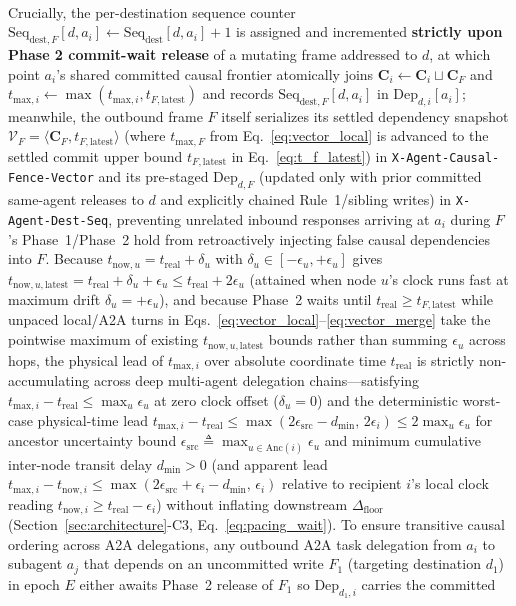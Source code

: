 \documentclass[conference,10pt]{IEEEtran}
\begin{document}
\begin{enumerate}
\begin{equation}
\begin{aligned}
    \end{aligned}
    \label{eq:vector_local}
    \end{equation}
    Crucially, the per-destination sequence counter $\text{Seq}_{\text{dest},F}[d, a_i] \leftarrow \text{Seq}_{\text{dest}}[d, a_i] + 1$ is assigned and incremented \textbf{strictly upon Phase 2 commit-wait release} of a mutating frame addressed to $d$, at which point $a_i$'s shared committed causal frontier atomically joins $\mathbf{C}_i \leftarrow \mathbf{C}_i \sqcup \mathbf{C}_F$ and $t_{\text{max},i} \leftarrow \max(t_{\text{max},i}, t_{F,\text{latest}})$ and records $\text{Seq}_{\text{dest},F}[d, a_i]$ in $\text{Dep}_{d,i}[a_i]$; meanwhile, the outbound frame $F$ itself serializes its settled dependency snapshot $\mathcal{V}_F = \langle \mathbf{C}_F, t_{F,\text{latest}} \rangle$ (where $t_{\text{max},F}$ from Eq.~\eqref{eq:vector_local} is advanced to the settled commit upper bound $t_{F,\text{latest}}$ in Eq.~\eqref{eq:t_f_latest}) in \texttt{X-Agent-Causal-Fence-Vector} and its pre-staged $\text{Dep}_{d,F}$ (updated only with prior committed same-agent releases to $d$ and explicitly chained Rule~1/sibling writes) in \texttt{X-Agent-Dest-Seq}, preventing unrelated inbound responses arriving at $a_i$ during $F$'s Phase~1/Phase~2 hold from retroactively injecting false causal dependencies into $F$. Because $t_{\text{now},u} = t_{\text{real}} + \delta_u$ with $\delta_u \in [-\epsilon_u, +\epsilon_u]$ gives $t_{\text{now},u,\text{latest}} = t_{\text{real}} + \delta_u + \epsilon_u \le t_{\text{real}} + 2\epsilon_u$ (attained when node $u$'s clock runs fast at maximum drift $\delta_u = +\epsilon_u$), and because Phase~2 waits until $t_{\text{real}} \ge t_{F,\text{latest}}$ while unpaced local/A2A turns in Eqs.~\eqref{eq:vector_local}--\eqref{eq:vector_merge} take the pointwise maximum of existing $t_{\text{now},u,\text{latest}}$ bounds rather than summing $\epsilon_u$ across hops, the physical lead of $t_{\text{max},i}$ over absolute coordinate time $t_{\text{real}}$ is strictly non-accumulating across deep multi-agent delegation chains---satisfying $t_{\text{max},i} - t_{\text{real}} \le \max_u \epsilon_u$ at zero clock offset ($\delta_u = 0$) and the deterministic worst-case physical-time lead $t_{\text{max},i} - t_{\text{real}} \le \max(2\epsilon_{\text{src}} - d_{\min},\, 2\epsilon_i) \le 2\max_u \epsilon_u$ for ancestor uncertainty bound $\epsilon_{\text{src}} \triangleq \max_{u \in \text{Anc}(i)} \epsilon_u$ and minimum cumulative inter-node transit delay $d_{\min} > 0$ (and apparent lead $t_{\text{max},i} - t_{\text{now},i} \le \max(2\epsilon_{\text{src}} + \epsilon_i - d_{\min},\, \epsilon_i)$ relative to recipient $i$'s local clock reading $t_{\text{now},i} \ge t_{\text{real}} - \epsilon_i$) without inflating downstream $\Delta_{\text{floor}}$ (Section~\ref{sec:architecture}-C3, Eq.~\eqref{eq:pacing_wait}). To ensure transitive causal ordering across A2A delegations, any outbound A2A task delegation from $a_i$ to subagent $a_j$ that depends on an uncommitted write $F_1$ (targeting destination $d_1$) in epoch $E$ either awaits Phase~2 release of $F_1$ so $\text{Dep}_{d_1,i}$ carries the committed 
\end{enumerate}
\end{document}
